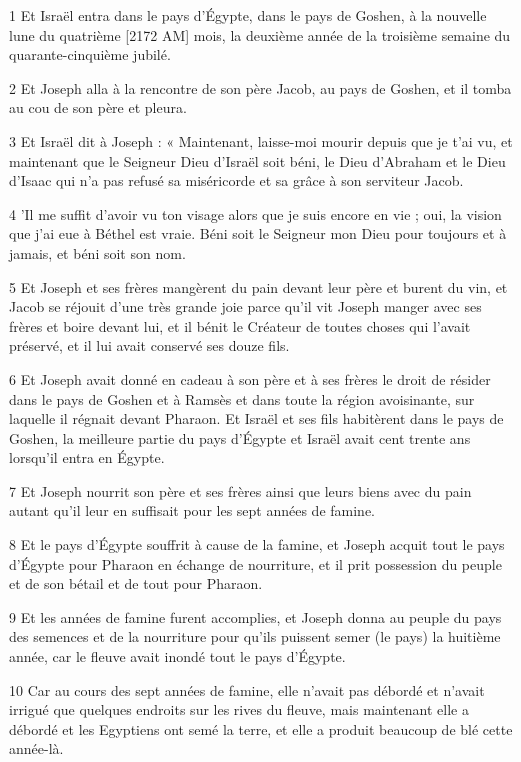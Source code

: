 \par 1 Et Israël entra dans le pays d'Égypte, dans le pays de Goshen, à la nouvelle lune du quatrième [2172 AM] mois, la deuxième année de la troisième semaine du quarante-cinquième jubilé.
\par 2 Et Joseph alla à la rencontre de son père Jacob, au pays de Goshen, et il tomba au cou de son père et pleura.
\par 3 Et Israël dit à Joseph : « Maintenant, laisse-moi mourir depuis que je t'ai vu, et maintenant que le Seigneur Dieu d'Israël soit béni, le Dieu d'Abraham et le Dieu d'Isaac qui n'a pas refusé sa miséricorde et sa grâce à son serviteur Jacob.
\par 4 'Il me suffit d'avoir vu ton visage alors que je suis encore en vie ; oui, la vision que j'ai eue à Béthel est vraie. Béni soit le Seigneur mon Dieu pour toujours et à jamais, et béni soit son nom.
\par 5 Et Joseph et ses frères mangèrent du pain devant leur père et burent du vin, et Jacob se réjouit d'une très grande joie parce qu'il vit Joseph manger avec ses frères et boire devant lui, et il bénit le Créateur de toutes choses qui l'avait préservé, et il lui avait conservé ses douze fils.
\par 6 Et Joseph avait donné en cadeau à son père et à ses frères le droit de résider dans le pays de Goshen et à Ramsès et dans toute la région avoisinante, sur laquelle il régnait devant Pharaon. Et Israël et ses fils habitèrent dans le pays de Goshen, la meilleure partie du pays d'Égypte et Israël avait cent trente ans lorsqu'il entra en Égypte.
\par 7 Et Joseph nourrit son père et ses frères ainsi que leurs biens avec du pain autant qu'il leur en suffisait pour les sept années de famine.
\par 8 Et le pays d'Égypte souffrit à cause de la famine, et Joseph acquit tout le pays d'Égypte pour Pharaon en échange de nourriture, et il prit possession du peuple et de son bétail et de tout pour Pharaon.
\par 9 Et les années de famine furent accomplies, et Joseph donna au peuple du pays des semences et de la nourriture pour qu'ils puissent semer (le pays) la huitième année, car le fleuve avait inondé tout le pays d'Égypte.
\par 10 Car au cours des sept années de famine, elle n'avait pas débordé et n'avait irrigué que quelques endroits sur les rives du fleuve, mais maintenant elle a débordé et les Egyptiens ont semé la terre, et elle a produit beaucoup de blé cette année-là.
